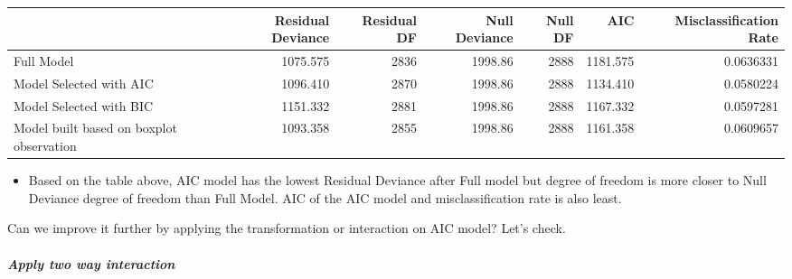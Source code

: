 \documentclass[
]{article}
\newenvironment{Shaded}{\begin{snugshade}}{\end{snugshade}}
\newcommand{\DataTypeTok}[1]{\textcolor[rgb]{0.13,0.29,0.53}{#1}}
\newcommand{\KeywordTok}[1]{\textcolor[rgb]{0.13,0.29,0.53}{\textbf{#1}}}
\newcommand{\NormalTok}[1]{#1}
\newcommand{\OperatorTok}[1]{\textcolor[rgb]{0.81,0.36,0.00}{\textbf{#1}}}
\newcommand{\StringTok}[1]{\textcolor[rgb]{0.31,0.60,0.02}{#1}}
\providecommand{\tightlist}{%
  \setlength{\itemsep}{0pt}\setlength{\parskip}{0pt}}
\begin{document}
\begin{Shaded}
\end{Shaded}

\begin{table}[H]
\centering
\begin{tabular}{l|r|r|r|r|r|r}
\hline
  & Residual Deviance & Residual DF & Null Deviance & Null DF & AIC  & Misclassification Rate\\
\hline
Full Model & 1075.575 & 2836 & 1998.86 & 2888 & 1181.575 & 0.0636331\\
\hline
Model Selected with AIC & 1096.410 & 2870 & 1998.86 & 2888 & 1134.410 & 0.0580224\\
\hline
Model Selected with BIC & 1151.332 & 2881 & 1998.86 & 2888 & 1167.332 & 0.0597281\\
\hline
Model built based on boxplot observation & 1093.358 & 2855 & 1998.86 & 2888 & 1161.358 & 0.0609657\\
\hline
\end{tabular}
\end{table}

\begin{itemize}
\tightlist
\item
  Based on the table above, AIC model has the lowest Residual Deviance
  after Full model but degree of freedom is more closer to Null Deviance
  degree of freedom than Full Model. AIC of the AIC model and
  misclassification rate is also least.
\end{itemize}

Can we improve it further by applying the transformation or interaction
on AIC model? Let's check.

\hypertarget{apply-two-way-interaction}{%
\subparagraph{Apply two way
interaction}\label{apply-two-way-interaction}}
\end{document}
